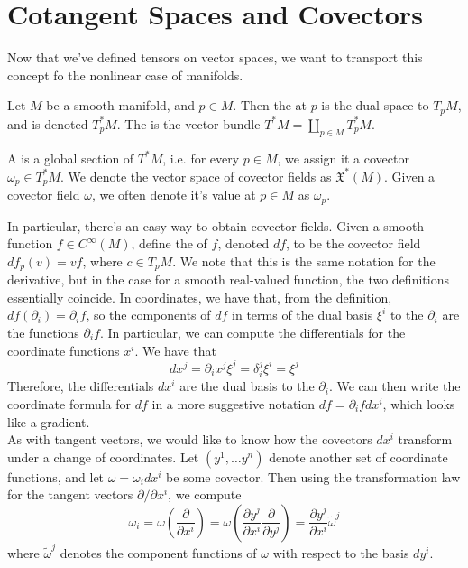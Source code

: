 \section{Cotangent Spaces and Covectors}
%
Now that we've defined tensors on vector spaces, we want to transport this
concept fo the nonlinear case of manifolds.
\begin{defn}
Let $M$ be a smooth manifold, and $p \in M$. Then the  at
$p$ is the dual space to $T_pM$, and is denoted $T^*_pM$. The
 is the vector bundle $T^*M = \coprod_{p \in M}T_p^*M$.
\end{defn}
%
\begin{defn}
A  is a global section of $T^*M$, i.e. for every $p \in M$,
we assign it a covector $\omega_p \in T_p^*M$. We denote the vector space of
covector fields as $\mathfrak{X}^*(M)$. Given a covector field $\omega$, we
often denote it's value at $p \in M$ as $\omega_p$.
\end{defn}
%
In particular, there's an easy way to obtain covector fields. Given a smooth
function $f \in C^\infty(M)$, define the  of $f$, denoted $df$,
to be the covector field $df_p(v) = vf$, where $c \in T_pM$. We note that this
is the same notation for the derivative, but in the case for a smooth
real-valued function, the two definitions essentially coincide. In coordinates,
we have that, from the definition, $df(\partial_i) = \partial_i f$, so
the components of $df$ in terms of the dual basis $\xi^i$ to the $\partial_i$
are the functions $\partial_i f$. In particular, we can compute the
differentials for the coordinate functions $x^i$. We have that
$$dx^j = \partial_i x^j \xi^j = \delta^j_i \xi^i = \xi^j $$
Therefore, the differentials $dx^i$ are the dual basis to the $\partial_i$.
We can then write the coordinate formula for $df$ in a more suggestive notation
$df = \partial_i f dx^i$, which looks like a gradient. \\

As with tangent vectors, we would like to know how the covectors $dx^i$
transform under a change of coordinates. Let $(y^1, \ldots y^n)$ denote another
set of coordinate functions, and let $\omega = \omega_i dx^i$ be some covector.
Then using the transformation law for the tangent vectors
$\partial/ \partial x^i$, we compute
$$\omega_i = \omega\left( \frac{\partial}{\partial x^i} \right)  =
\omega\left( \frac{\partial y^j}{\partial x^i}\frac{\partial}{\partial y^j} \right)
= \frac{\partial y^j}{\partial x^i}\tilde{\omega}^j$$
where $\tilde{\omega}^j$ denotes the component functions of $\omega$ with respect
to the basis $dy^i$. \\


